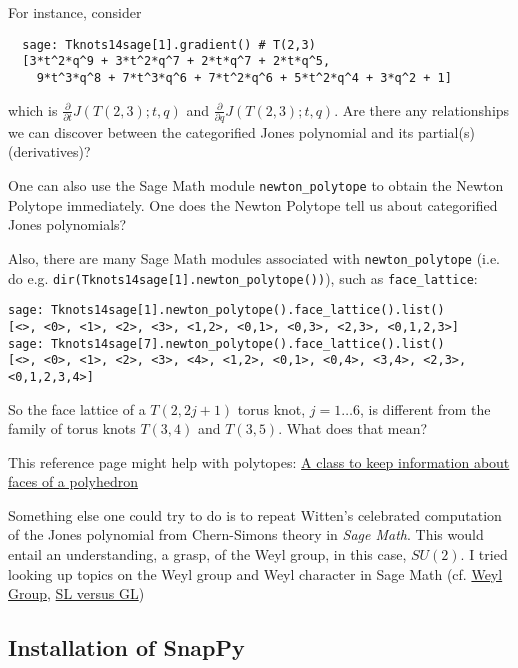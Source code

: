 \documentclass[10pt]{amsart}
\begin{document}
\begin{multicols}{2}
For instance, consider 
\begin{lstlisting}
  sage: Tknots14sage[1].gradient() # T(2,3)
  [3*t^2*q^9 + 3*t^2*q^7 + 2*t*q^7 + 2*t*q^5,
    9*t^3*q^8 + 7*t^3*q^6 + 7*t^2*q^6 + 5*t^2*q^4 + 3*q^2 + 1]
\end{lstlisting}
which is $\frac{ \partial }{ \partial t} J(T(2,3);t,q)$ and $\frac{ \partial }{ \partial q} J(T(2,3);t,q)$.  Are there any relationships we can discover between the categorified Jones polynomial and its partial(s) (derivatives)?

One can also use the Sage Math module \verb|newton_polytope| to obtain the Newton Polytope immediately.  One does the Newton Polytope tell us about categorified Jones polynomials?

Also, there are many Sage Math modules associated with \verb|newton_polytope| (i.e. do e.g. \verb|dir(Tknots14sage[1].newton_polytope())|), such as \verb|face_lattice|:
\begin{lstlisting}
sage: Tknots14sage[1].newton_polytope().face_lattice().list()
[<>, <0>, <1>, <2>, <3>, <1,2>, <0,1>, <0,3>, <2,3>, <0,1,2,3>]
sage: Tknots14sage[7].newton_polytope().face_lattice().list()
[<>, <0>, <1>, <2>, <3>, <4>, <1,2>, <0,1>, <0,4>, <3,4>, <2,3>, <0,1,2,3,4>]
\end{lstlisting}
So the face lattice of a $T(2,2j+1)$ torus knot, $j=1\dots 6$, is different from the family of torus knots $T(3,4)$ and $T(3,5)$.  What does that mean?  

This reference page might help with polytopes: \href{http://doc.sagemath.org/html/en/reference/geometry/sage/geometry/polyhedron/face.html}{A class to keep information about faces of a polyhedron}

Something else one could try to do is to repeat Witten's celebrated computation of the Jones polynomial from Chern-Simons theory \cite{Witten:1988hf} in \emph{Sage Math}.  This would entail an understanding, a grasp, of the Weyl group, in this case, $SU(2)$.  I tried looking up topics on the Weyl group and Weyl character in Sage Math (cf. \href{http://doc.sagemath.org/html/en/reference/combinat/sage/combinat/root_system/weyl_group.html}{Weyl Group}, \href{https://www.math.ucdavis.edu/~anne/SQ2014/thematic_tutorials/lie/weyl_character_ring.html\#slvsgl}{SL versus GL})



\subsection{Installation of SnapPy}\label{SubSec:InstallSnapPy}


\end{multicols}
\end{document}
